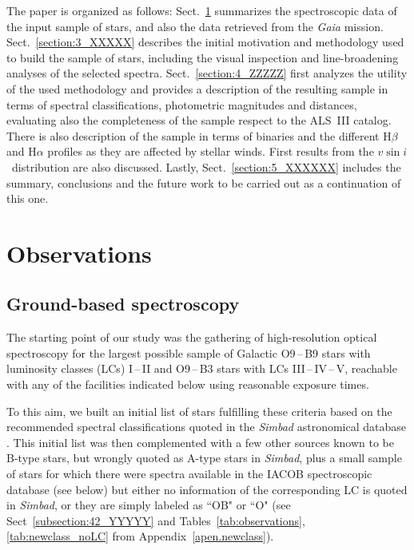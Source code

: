 \documentclass{aa}
\newcommand{\vsini}{\mbox{$v\sin i$}}
\begin{document}
The paper is organized as follows: Sect.~\ref{section:2_XXXXX} summarizes the spectroscopic data of the input sample of stars, and also the data retrieved from the {\em Gaia} mission. Sect.~\ref{section:3_XXXXX} describes the initial motivation and methodology used to build the sample of stars, including the visual inspection and line-broadening analyses of the selected spectra. Sect.~\ref{section:4_ZZZZZ} first analyzes the utility of the used methodology and provides a description of the resulting sample in terms of spectral classifications, photometric magnitudes and distances, evaluating also the completeness of the sample respect to the ALS~III catalog. There is also description of the sample in terms of binaries and the different H$\beta$ and H$\alpha$ profiles as they are affected by stellar winds. First results from the \vsini\ distribution are also discussed. Lastly, Sect.~\ref{section:5_XXXXXX} includes the summary, conclusions and  the future work to be carried out as a continuation of this one.






\section{Observations}
\label{section:2_XXXXX}




\subsection{Ground-based spectroscopy}
\label{subsection:21_YYYYY}


The starting point of our study was the gathering of high-resolution optical spectroscopy for the largest possible sample of Galactic O9\,--\,B9 stars with luminosity classes (LCs) I\,--\,II and O9\,--\,B3 stars with LCs III\,--\,IV\,--\,V, reachable with any of the facilities indicated below using reasonable exposure times.

To this aim, we built an initial list of stars fulfilling these criteria based on the recommended spectral classifications quoted in the \textit{Simbad} astronomical database \citep{2000A&AS..143....9W}. This initial list was then complemented with a few other sources known to be B-type stars, but wrongly quoted as A-type stars in \textit{Simbad}, plus a small sample of stars for which there were spectra available in the IACOB spectroscopic database (see below) but either no information of the corresponding LC is quoted in \textit{Simbad}, or they are simply labeled as ``OB" or ``O" (see Sect~\ref{subsection:42_YYYYY} and Tables~\ref{tab:observations}, \ref{tab:newclass_noLC} from Appendix~\ref{apen.newclass}).
\end{document}
